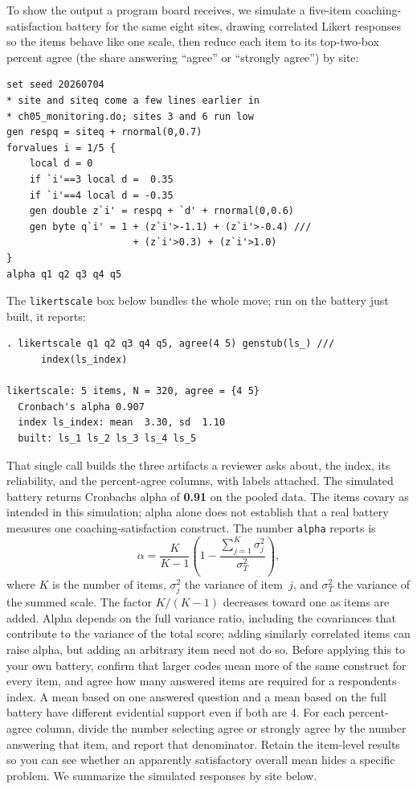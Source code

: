 \documentclass[
    a4paper,
    fontsize=10pt,
    twoside=true,
    numbers=noenddot,
]{kaobook}
\begin{document}
To show the output a program board receives, we simulate a five-item coaching-satisfaction battery for the same eight sites, drawing correlated Likert responses so the items behave like one scale, then reduce each item to its top-two-box percent agree (the share answering \enquote{agree} or \enquote{strongly agree}) by site:
\par
{\footnotesize
\begin{verbatim}
set seed 20260704
* site and siteq come a few lines earlier in
* ch05_monitoring.do; sites 3 and 6 run low
gen respq = siteq + rnormal(0,0.7)
forvalues i = 1/5 {
    local d = 0
    if `i'==3 local d =  0.35
    if `i'==4 local d = -0.35
    gen double z`i' = respq + `d' + rnormal(0,0.6)
    gen byte q`i' = 1 + (z`i'>-1.1) + (z`i'>-0.4) ///
                      + (z`i'>0.3) + (z`i'>1.0)
}
alpha q1 q2 q3 q4 q5
\end{verbatim}
}
The \texttt{likertscale} box below bundles the whole move; run on the battery just built, it reports:
\par
{\footnotesize
\begin{verbatim}
. likertscale q1 q2 q3 q4 q5, agree(4 5) genstub(ls_) ///
      index(ls_index)

likertscale: 5 items, N = 320, agree = {4 5}
  Cronbach's alpha 0.907
  index ls_index: mean  3.30, sd  1.10
  built: ls_1 ls_2 ls_3 ls_4 ls_5
\end{verbatim}
}
That single call builds the three artifacts a reviewer asks about, the index, its reliability, and the percent-agree columns, with labels attached.
The simulated battery returns Cronbach\textquotesingle s alpha of \textbf{0.91} on the pooled data. The items covary as intended in this simulation; alpha alone does not establish that a real battery measures one coaching-satisfaction construct. The number \texttt{alpha} reports is
\[
  \alpha=\frac{K}{K-1}\left(1-\frac{\sum_{j=1}^{K}\sigma_j^2}{\sigma_T^2}\right),
\]
where $K$ is the number of items, $\sigma_j^2$ the variance of item~$j$, and $\sigma_T^2$ the variance of the summed scale. The factor $K/(K-1)$ decreases toward one as items are added. Alpha depends on the full variance ratio, including the covariances that contribute to the variance of the total score; adding similarly correlated items can raise alpha, but adding an arbitrary item need not do so. Before applying this to your own battery, confirm that larger codes mean more of the same construct for every item, and agree how many answered items are required for a respondent\textquotesingle s index. A mean based on one answered question and a mean based on the full battery have different evidential support even if both are 4. For each percent-agree column, divide the number selecting agree or strongly agree by the number answering that item, and report that denominator. Retain the item-level results so you can see whether an apparently satisfactory overall mean hides a specific problem. We summarize the simulated responses by site below.
\end{document}
